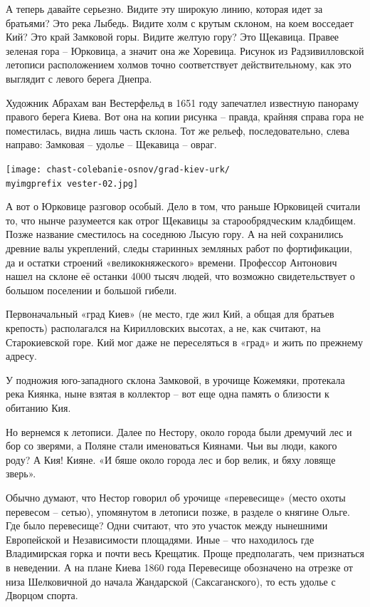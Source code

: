 А теперь давайте серьезно. Видите эту широкую линию, которая идет за братьями? Это река Лыбедь. Видите холм с крутым склоном, на коем восседает Кий? Это край Замковой горы. Видите желтую гору? Это Щекавица. Правее зеленая гора – Юрковица, а значит она же Хоревица. Рисунок из Радзивилловской летописи расположением холмов точно соответствует действительному, как это выглядит с левого берега Днепра.

Художник Абрахам ван Вестерфельд в 1651 году запечатлел известную панораму правого берега Киева. Вот она на копии рисунка – правда, крайняя справа гора не поместилась, видна лишь часть склона. Тот же рельеф, последовательно, слева направо: Замковая – удолье – Щекавица – овраг.
 
\begin{center}
\texttt{[image: chast-colebanie-osnov/grad-kiev-urk/\\myimgprefix vester-02.jpg]}
\end{center} 

А вот о Юрковице разговор особый. Дело в том, что раньше Юрковицей считали то, что нынче разумеется как отрог Щекавицы за старообрядческим кладбищем. Позже название сместилось на соседнюю Лысую гору. А на ней сохранились древние валы укреплений, следы старинных земляных работ по фортификации, да и остатки строений «великокняжеского» времени. Профессор Антонович нашел на склоне её останки 4000 тысяч людей, что возможно свидетельствует о большом поселении и большой гибели.

Первоначальный «град Киев» (не место, где жил Кий, а общая для братьев крепость) располагался на Кирилловских высотах, а не, как считают, на Старокиевской горе. Кий мог даже не переселяться в «град» и жить по прежнему адресу.

У подножия юго-западного склона Замковой, в урочище Кожемяки, протекала река Киянка, ныне взятая в коллектор – вот еще одна память о близости к обитанию Кия.

Но вернемся к летописи. Далее по Нестору, около города были дремучий лес и бор со зверями, а Поляне стали именоваться Киянами. Чьи вы люди, какого роду? А Кия! Кияне. «И бяше около города лес и бор велик, и бяху ловяще зверь». 

Обычно думают, что Нестор говорил об урочище «перевесище» (место охоты перевесом – сетью), упомянутом в летописи позже, в разделе о княгине Ольге. Где было перевесище? Одни считают, что это участок между нынешними Европейской и Независимости площадями. Иные – что находилось где Владимирская горка и почти весь Крещатик. Проще предполагать, чем признаться в неведении. А на плане Киева 1860 года Перевесище обозначено на отрезке от низа Шелковичной до начала Жандарской (Саксаганского), то есть удолье с Дворцом спорта.

